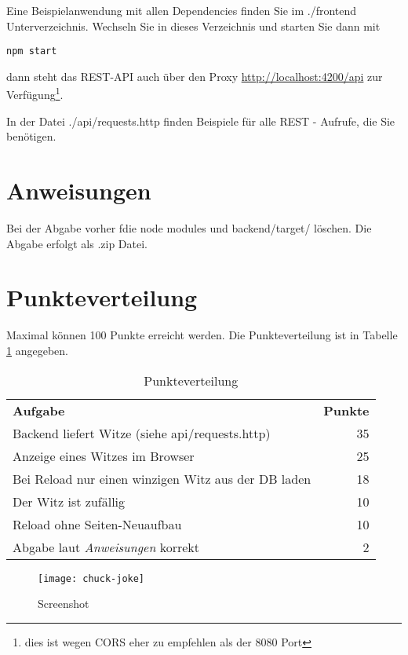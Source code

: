 \documentclass[a4paper, 11pt]{article}
\begin{document}
Eine Beispielanwendung mit allen Dependencies finden Sie im ./frontend Unterverzeichnis.
Wechseln Sie in dieses Verzeichnis und starten Sie dann mit
\begin{verbatim}
npm start
\end{verbatim}

dann steht das REST-API auch über den Proxy 
\href{http://localhost:4200/api}{http://localhost:4200/api} zur Verfügung\footnote{dies ist wegen CORS eher zu empfehlen als der 8080 Port}.

In der Datei ./api/requests.http finden Beispiele für alle REST - Aufrufe, die Sie benötigen. 
\section{Anweisungen}

Bei der Abgabe vorher fdie node modules und backend/target/ löschen. Die Abgabe erfolgt als .zip Datei.


\section{Punkteverteilung}
Maximal können 100 Punkte erreicht werden. Die Punkteverteilung ist in Tabelle \ref{tab:points} angegeben.
\begin{table}[ht]
\centering
\caption{Punkteverteilung}

\begin{tabular}{| l | r |} \cline{1-2} 
\textbf{Aufgabe} &  \textbf{Punkte}  \\ \cline{1-2}
Backend liefert Witze (siehe api/requests.http) & 35 \\ \cline{1-2}
Anzeige eines Witzes im Browser & 25 \\ \cline{1-2}
Bei Reload nur einen winzigen Witz aus der DB laden & 18 \\ \cline{1-2}
Der Witz ist zufällig & 10 \\ \cline{1-2}
Reload ohne Seiten-Neuaufbau & 10 \\ \cline{1-2}
Abgabe laut \textit{Anweisungen} korrekt & 2 \\ \cline{1-2}
\end{tabular}
\label{tab:points}
\end{table}

\begin{figure}
	\center
	\texttt{[image: chuck-joke]}
	\caption{Screenshot}
	\label{fig:img}
\end{figure}
\end{document}
